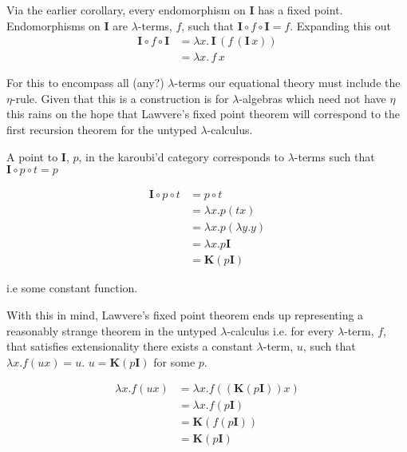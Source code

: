\documentclass[ %
                author={Alessio Zakaria},
                supervisor={Dr. Nicolas Wu},
                degree={MEng},
                title={Automated Theorem Proving in Category Theory and the
                $\lambda$-calculus},
                subtitle={},
                type={Research},
                year={2019} ]{dissertation}
\begin{document}
Via the earlier corollary, every endomorphism on \textbf{I} has a fixed point.
Endomorphisms on \textbf{I} are $\lambda$-terms, $f$, such that $\textbf{I}
\circ f \circ \textbf{I} = f$. Expanding this out
\begin{align*}
    \textbf{I} \circ f \circ \textbf{I} &= \lambda x . \, \textbf{I} \, (f \, (\textbf{I}
    \, x)) \\
    &= \lambda x . \, f \, x
\end{align*}

For this to encompass all (any?) $\lambda$-terms our equational theory must
include the $\eta$-rule. Given that this is a construction is for
$\lambda$-algebras which need not have $\eta$ this rains on the hope that
Lawvere's fixed point theorem will correspond to the first recursion theorem for
the untyped $\lambda$-calculus.

A point to \textbf{I}, $p$, in the karoubi'd category corresponds to $\lambda$-terms such
that $\textbf{I} \circ p \circ t = p$

\begin{align*}
    \textbf{I} \circ p \circ t &= p \circ t \\
    &= \lambda x . p (t x) \\
    &= \lambda x . p (\lambda y . y) \\
    &= \lambda x . p \textbf{I} \\
    &= \textbf{K} (p \textbf{I})
\end{align*}

i.e some constant function.

With this in mind, Lawvere's fixed point theorem ends up representing a
reasonably strange theorem in the untyped $\lambda$-calculus i.e. for every
$\lambda$-term, $f$, that satisfies extensionality there exists a constant
$\lambda$-term, $u$, such that $\lambda x . f (u x) = u$. $u =
\textbf{K}(p\textbf{I})$ for some $p$.

\begin{align*}
    \lambda x . f (u x ) &= \lambda x . f(( \textbf{K} (p \textbf{I})) x) \\
    &= \lambda x . f(p \textbf{I}) \\
    &= \textbf{K} (f (p \textbf{I})) \\
    &= \textbf{K} (p \textbf{I})
\end{align*}


\end{document}
